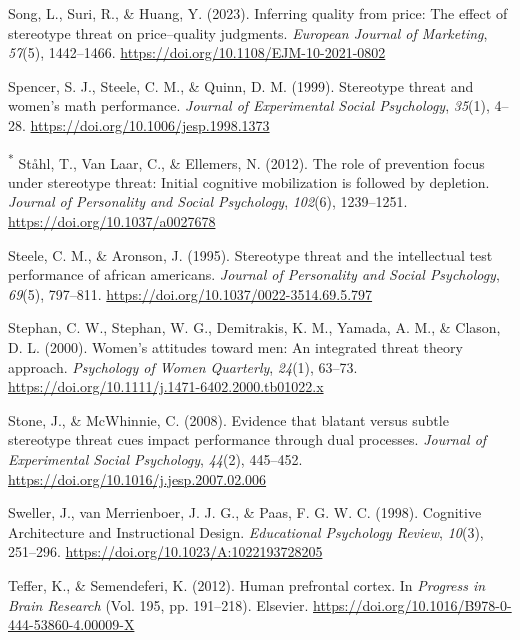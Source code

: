 \documentclass[
  stu, a4paper, 12pt,mask,floatsintext]{apa7}
\newlength{\cslhangindent}
\newenvironment{CSLReferences}[2] %
 {\begin{list}{}{%
  \setlength{\itemindent}{0pt}
  \setlength{\leftmargin}{0pt}
  \setlength{\parsep}{0pt}
  \ifodd #1
   \setlength{\leftmargin}{\cslhangindent}
   \setlength{\itemindent}{-1\cslhangindent}
  \fi
  \setlength{\itemsep}{#2\baselineskip}}}
 {\end{list}}
\begin{document}
\begin{CSLReferences}{1}{0}
Song, L., Suri, R., \& Huang, Y. (2023). Inferring quality from price: The effect of stereotype threat on price--quality judgments. \emph{European Journal of Marketing}, \emph{57}(5), 1442--1466. \url{https://doi.org/10.1108/EJM-10-2021-0802}

Spencer, S. J., Steele, C. M., \& Quinn, D. M. (1999). Stereotype threat and women's math performance. \emph{Journal of Experimental Social Psychology}, \emph{35}(1), 4--28. \url{https://doi.org/10.1006/jesp.1998.1373}

\textsuperscript{*} Ståhl, T., Van Laar, C., \& Ellemers, N. (2012). The role of prevention focus under stereotype threat: {Initial} cognitive mobilization is followed by depletion. \emph{Journal of Personality and Social Psychology}, \emph{102}(6), 1239--1251. \url{https://doi.org/10.1037/a0027678}

Steele, C. M., \& Aronson, J. (1995). Stereotype threat and the intellectual test performance of african americans. \emph{Journal of Personality and Social Psychology}, \emph{69}(5), 797--811. \url{https://doi.org/10.1037/0022-3514.69.5.797}

Stephan, C. W., Stephan, W. G., Demitrakis, K. M., Yamada, A. M., \& Clason, D. L. (2000). Women's attitudes toward men: An integrated threat theory approach. \emph{Psychology of Women Quarterly}, \emph{24}(1), 63--73. \url{https://doi.org/10.1111/j.1471-6402.2000.tb01022.x}

Stone, J., \& McWhinnie, C. (2008). Evidence that blatant versus subtle stereotype threat cues impact performance through dual processes. \emph{Journal of Experimental Social Psychology}, \emph{44}(2), 445--452. \url{https://doi.org/10.1016/j.jesp.2007.02.006}

Sweller, J., van Merrienboer, J. J. G., \& Paas, F. G. W. C. (1998). Cognitive {Architecture} and {Instructional Design}. \emph{Educational Psychology Review}, \emph{10}(3), 251--296. \url{https://doi.org/10.1023/A:1022193728205}

Teffer, K., \& Semendeferi, K. (2012). Human prefrontal cortex. In \emph{Progress in {Brain Research}} (Vol. 195, pp. 191--218). Elsevier. \url{https://doi.org/10.1016/B978-0-444-53860-4.00009-X}


\end{CSLReferences}
\end{document}
